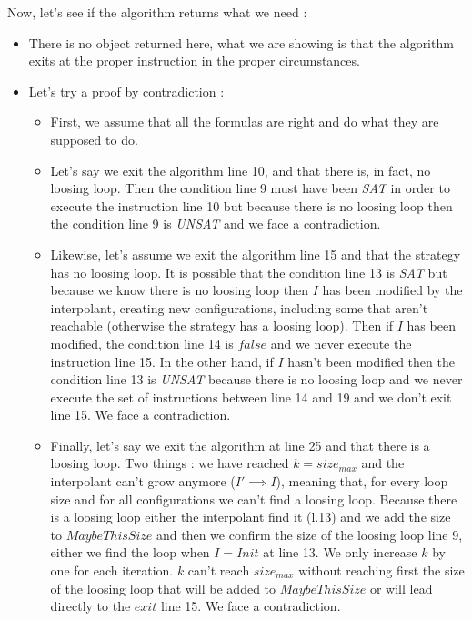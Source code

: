 \documentclass{article}
\begin{document}
\noindent Now, let's see if the algorithm returns what we need :
\begin{itemize}
    \item There is no object returned here, what we are showing is that the algorithm exits at the proper instruction in the proper circumstances.
    \item Let's try a proof by contradiction :
    \begin{itemize}
        \item First, we assume that all the formulas are right and do what they are supposed to do.
        \item Let's say we exit the algorithm line 10, and that there is, in fact, no loosing loop. Then the condition line 9 must have been \textit{SAT} in order to execute the instruction line 10 but because there is no loosing loop then the condition line 9 is \textit{UNSAT} and we face a contradiction.
        \item Likewise, let's assume we exit the algorithm line 15 and that the strategy has no loosing loop. It is possible that the condition line 13 is \textit{SAT} but because we know there is no loosing loop then $I$ has been modified by the interpolant, creating new configurations, including some that aren't reachable (otherwise the strategy has a loosing loop). Then if $I$ has been modified, the condition line 14 is $false$ and we never execute the instruction line 15. In the other hand, if $I$ hasn't been modified then the condition line 13 is \textit{UNSAT} because there is no loosing loop and we never execute the set of instructions between line 14 and 19 and we don't exit line 15. We face a contradiction.
        \item Finally, let's say we exit the algorithm at line 25 and that there is a loosing loop. Two things : we have reached $k = size_{max}$ and the interpolant can't grow anymore ($I' \implies I$), meaning that, for every loop size and for all configurations we can't find a loosing loop. Because there is a loosing loop either the interpolant find it (l.13) and we add the size to $MaybeThisSize$ and then we confirm the size of the loosing loop line 9, either we find the loop when $I = Init$ at line 13. We only increase $k$ by one for each iteration. $k$ can't reach $size_{max}$ without reaching first the size of the loosing loop that will be added to $MaybeThisSize$ or will lead directly to the $exit$ line 15. We face a contradiction.
    \end{itemize}
\end{itemize}
\newpage
\end{document}
